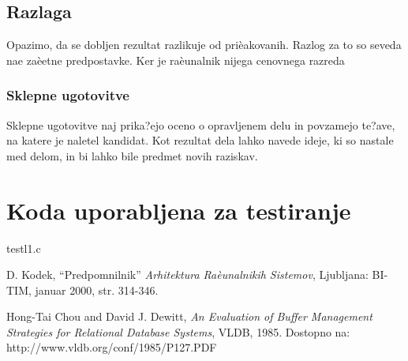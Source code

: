 \documentclass[12pt,a4paper,openany]{book}
\begin{document}
\section{Razlaga}
Opazimo, da se dobljen rezultat razlikuje od prièakovanih. Razlog za to so seveda nae zaèetne predpostavke. Ker je raèunalnik nijega
cenovnega razreda 


\subsection{Sklepne ugotovitve}

Sklepne ugotovitve naj prika?ejo oceno o opravljenem delu in povzamejo te?ave, na katere je naletel kandidat. Kot rezultat dela
lahko navede ideje, ki so nastale med delom, in bi lahko bile predmet novih raziskav.


\newpage


\appendix


\chapter{Koda uporabljena za testiranje}


{testl1.c} 

\newpage

\listoffigures

\newpage

\listoftables




\newpage

\label{stran_literatura}

\begin{thebibliography}{99}

 D. Kodek, ``Predpomnilnik'' 
\textit{Arhitektura Raèunalnikih Sistemov}, Ljubljana: BI-TIM, januar 2000, str. 314-346.

 Hong-Tai Chou and David J. Dewitt, \textit{An Evaluation of Buffer Management Strategies for Relational Database Systems}, VLDB, 1985.
Dostopno na:\\
http://www.vldb.org/conf/1985/P127.PDF




\end{thebibliography}
\end{document}
